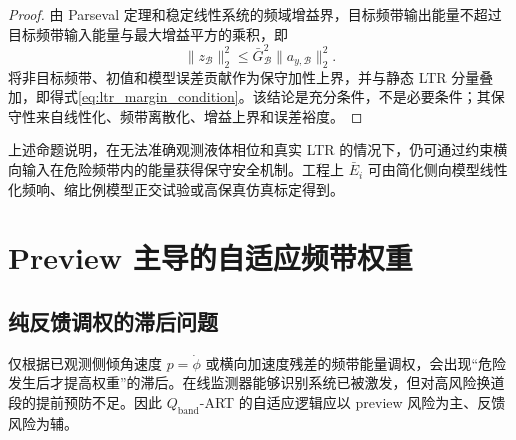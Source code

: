 \documentclass[UTF8,zihao=-4]{ctexrep}
\newcommand{\Qband}{$Q_{\mathrm{band}}$}
\begin{document}
\begin{proof}
由 Parseval 定理和稳定线性系统的频域增益界，目标频带输出能量不超过目标频带输入能量与最大增益平方的乘积，即
\begin{equation}
    \|z_{\mathcal B}\|_2^2\leq \bar G_{\mathcal B}^2\|a_{y,\mathcal B}\|_2^2.
\end{equation}
将非目标频带、初值和模型误差贡献作为保守加性上界，并与静态 LTR 分量叠加，即得式\eqref{eq:ltr_margin_condition}。该结论是充分条件，不是必要条件；其保守性来自线性化、频带离散化、增益上界和误差裕度。
\end{proof}

上述命题说明，在无法准确观测液体相位和真实 LTR 的情况下，仍可通过约束横向输入在危险频带内的能量获得保守安全机制。工程上 $\bar E_i$ 可由简化侧向模型线性化频响、缩比例模型正交试验或高保真仿真标定得到。

\section{Preview 主导的自适应频带权重}
\subsection{纯反馈调权的滞后问题}
仅根据已观测侧倾角速度 $p=\dot\phi$ 或横向加速度残差的频带能量调权，会出现“危险发生后才提高权重”的滞后。在线监测器能够识别系统已被激发，但对高风险换道段的提前预防不足。因此 \Qband-ART 的自适应逻辑应以 preview 风险为主、反馈风险为辅。
\end{document}
